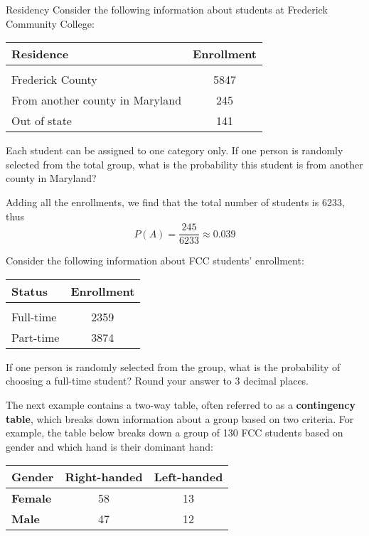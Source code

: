 \begin{example}[https://www.youtube.com/watch?v=odsxeO7wjqk]{Residency}
Consider the following information about students at Frederick Community College:

\begin{center}
\begin{tabular}{l c}
\textbf{Residence} & \textbf{Enrollment} \\ \hline 
& \\
Frederick County & 5847\\ 
From another county in Maryland  & 245  \\  
Out of state & 141 \\ 
\end{tabular}
\end{center}

Each student can be assigned to one category only. If one person is randomly selected from the total group, what is the probability this student is from another county in Maryland?  

\sol
Adding all the enrollments, we find that the total number of students is 6233, thus
\[  P(A) = \boxed{\frac{245}{6233} \approx 0.039} \]
\end{example}

\begin{try}
Consider the following information about FCC students' enrollment:

\begin{center}
\begin{tabular}{l c}
\textbf{Status} & \textbf{Enrollment} \\ \hline 
& \\
Full-time & 2359 \\ 
Part-time & 3874 \\  
\end{tabular}
\end{center}

If one person is randomly selected from the group, what is the probability of choosing a full-time student? Round your answer to 3 decimal places. 
\end{try}

The next example contains a two-way table, often referred to as a \textbf{contingency table}, which breaks down information about a group based on two criteria.  For example, the table below breaks down a group of 130 FCC students based on gender and which hand is their dominant hand:

\begin{center}
\begin{tabular}{l | c c}
\textbf{Gender} & \textbf{Right-handed} & \textbf{Left-handed} \\ \hline 
\textbf{Female} & 58 & 13\\ 
\textbf{Male} & 47 & 12  \\ 
\end{tabular}
\end{center}

